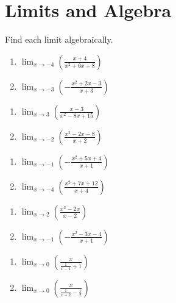 \chapter{Limits and Algebra}

Find each limit algebraically.

\begin{multicols}{2}
\begin{enumerate}
	\item $\lim_{x \to -4} \left(\frac{x+4}{x^2+6x+8}\right)$
	\item $\lim_{x \to -3} \left(-\frac{x^2+2x-3}{x+3}\right)$
\end{enumerate}	\setcounter{Review}{\value{enumi}}
\end{multicols}
\begin{multicols}{2}
\begin{enumerate}	\setcounter{enumi}{\value{Review}}
	\item $\lim_{x \to 3} \left(\frac{x-3}{x^2-8x+15}\right)$
	\item $\lim_{x \to -2} \left(\frac{x^2-2x-8}{x+2}\right)$
\end{enumerate}	\setcounter{Review}{\value{enumi}}
\end{multicols}
\begin{multicols}{2}
\begin{enumerate}	\setcounter{enumi}{\value{Review}}
	\item $\lim_{x \to -1} \left(-\frac{x^2+5x+4}{x+1}\right)$
	\item $\lim_{x \to -4} \left(\frac{x^2+7x+12}{x+4}\right)$
\end{enumerate}	\setcounter{Review}{\value{enumi}}
\end{multicols}
\begin{multicols}{2}
\begin{enumerate}	\setcounter{enumi}{\value{Review}}
	\item $\lim_{x \to 2} \left(\frac{x^2-2x}{x-2}\right)$
	\item $\lim_{x \to -1} \left(-\frac{x^2-3x-4}{x+1}\right)$
\end{enumerate}	\setcounter{Review}{\value{enumi}}
\end{multicols}
\begin{multicols}{2}
\begin{enumerate}	\setcounter{enumi}{\value{Review}}	
	\item $\lim_{x \to 0} \left(\frac{x}{\frac{1}{x-1}+1}\right)$
	\item $\lim_{x \to 0} \left(\frac{x}{\frac{1}{x+2}-\frac{1}{2}}\right)$
\end{enumerate}	\setcounter{Review}{\value{enumi}}
\end{multicols}
